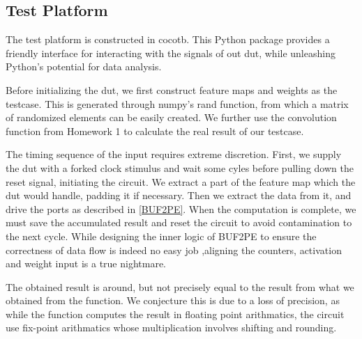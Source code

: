 \subsection{Test Platform}

The test platform is constructed in cocotb. This Python package provides a friendly interface for interacting with the signals of out dut, while unleashing Python's potential for data analysis. 

Before initializing the dut, we first construct feature maps and weights as the testcase. This is generated through numpy's rand function, from which a matrix of randomized elements can be easily created. We further use the convolution function from Homework 1 to calculate the real result of our testcase.

The timing sequence of the input requires extreme discretion. First, we supply the dut with a forked clock stimulus and wait some cyles before pulling down the reset signal, initiating the circuit. We extract a part of the feature map which the dut would handle, padding it if necessary. Then we extract the data from it, and drive the ports as described in \ref{BUF2PE}. When the computation is complete, we must save the accumulated result and reset the circuit to avoid contamination to the next cycle. While designing the inner logic of BUF2PE to ensure the correctness of data flow is indeed no easy job ,aligning the counters, activation and weight input is a true nightmare. 

The obtained result is around, but not precisely equal to the result from what we obtained from the function. We conjecture this is due to a loss of precision, as while the function computes the result in floating point arithmatics, the circuit use fix-point arithmatics whose multiplication involves shifting and rounding.